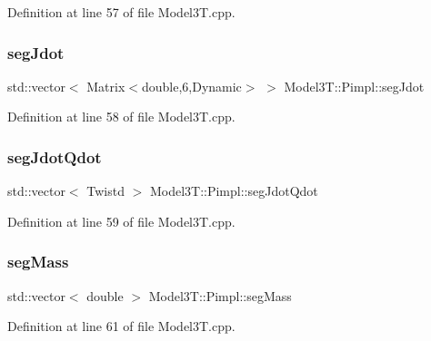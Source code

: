 Definition at line 57 of file Model3\+T.\+cpp.

\hypertarget{structModel3T_1_1Pimpl_af9cd027badf0a713437cd6d1a924cfb6}{}\label{structModel3T_1_1Pimpl_af9cd027badf0a713437cd6d1a924cfb6} 
\subsubsection{\texorpdfstring{seg\+Jdot}{segJdot}}
{\footnotesize\ttfamily std\+::vector$<$ Matrix$<$double,6,Dynamic$>$ $>$ Model3\+T\+::\+Pimpl\+::seg\+Jdot}



Definition at line 58 of file Model3\+T.\+cpp.

\hypertarget{structModel3T_1_1Pimpl_a504aa134750da2f42dfe8fa7e431b9cd}{}\label{structModel3T_1_1Pimpl_a504aa134750da2f42dfe8fa7e431b9cd} 
\subsubsection{\texorpdfstring{seg\+Jdot\+Qdot}{segJdotQdot}}
{\footnotesize\ttfamily std\+::vector$<$ Twistd $>$ Model3\+T\+::\+Pimpl\+::seg\+Jdot\+Qdot}



Definition at line 59 of file Model3\+T.\+cpp.

\hypertarget{structModel3T_1_1Pimpl_a96656676ff3aa9cddb99f58f453786c7}{}\label{structModel3T_1_1Pimpl_a96656676ff3aa9cddb99f58f453786c7} 
\subsubsection{\texorpdfstring{seg\+Mass}{segMass}}
{\footnotesize\ttfamily std\+::vector$<$ double $>$ Model3\+T\+::\+Pimpl\+::seg\+Mass}



Definition at line 61 of file Model3\+T.\+cpp.

\hypertarget{structModel3T_1_1Pimpl_a7d3d20f64bbe278275b6e74a49ebf9f6}{}\label{structModel3T_1_1Pimpl_a7d3d20f64bbe278275b6e74a49ebf9f6} 
